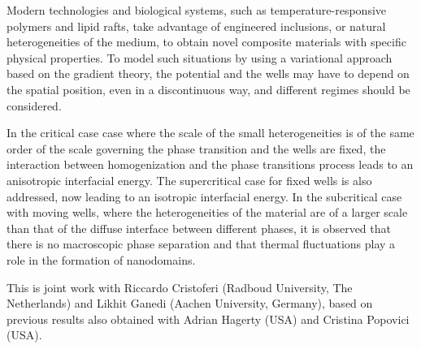 \mypage
{}
\begin{myabstract}
Modern technologies and biological systems, such as temperature-responsive polymers and lipid rafts, take advantage of engineered inclusions, or natural heterogeneities of the medium, to obtain novel composite materials with specific physical properties. To model such situations by using a variational approach based on the gradient theory, the potential and the wells may have to depend on the spatial position, even in a discontinuous way, and different regimes should be considered.

In the critical case case where the scale of the small heterogeneities is of the same order of the scale governing the phase transition and the wells are fixed, the interaction between homogenization and the phase transitions process leads to an anisotropic interfacial energy. The supercritical case for fixed wells is also addressed, now leading to an isotropic interfacial energy. In the subcritical case with moving wells, where the heterogeneities of the material are of a larger scale than that of the diffuse interface between different phases, it is observed that there is no macroscopic phase separation and that thermal fluctuations play a role in the formation of nanodomains.

This is joint work with Riccardo Cristoferi (Radboud University, The Netherlands) and Likhit Ganedi (Aachen University, Germany), based on previous results also obtained with Adrian Hagerty (USA) and Cristina Popovici (USA).
\end{myabstract}

